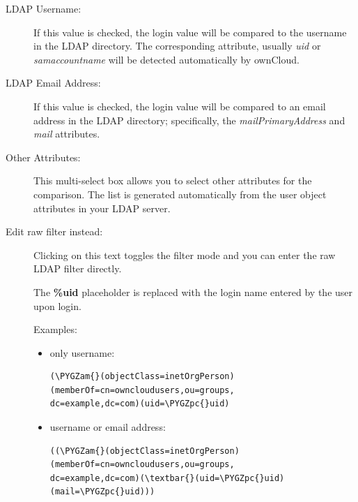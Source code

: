 \documentclass[letterpaper,10pt,english]{sphinxmanual}
\def\PYGZam{\char`\&}
\def\PYGZpc{\char`\%}
\begin{document}
\begin{description}
\item[{LDAP Username:}] \leavevmode
If this value is checked, the login value will be compared to the username in
the LDAP directory. The corresponding attribute, usually \emph{uid} or
\emph{samaccountname} will be detected automatically by ownCloud.

\item[{LDAP Email Address:}] \leavevmode
If this value is checked, the login value will be compared to an email address
in the LDAP directory; specifically, the \emph{mailPrimaryAddress} and \emph{mail}
attributes.

\item[{Other Attributes:}] \leavevmode
This multi-select box allows you to select other attributes for the
comparison. The list is generated automatically from the user object
attributes in your LDAP server.

\item[{Edit raw filter instead:}] \leavevmode
Clicking on this text toggles the filter mode and you can enter the raw LDAP
filter directly.

The \textbf{\%uid} placeholder is replaced with the login name entered by the
user upon login.

Examples:
\begin{itemize}
\item {} 
only username:

\begin{Verbatim}[commandchars=\\\{\}]
(\PYGZam{}(objectClass=inetOrgPerson)(memberOf=cn=owncloudusers,ou=groups,
dc=example,dc=com)(uid=\PYGZpc{}uid)
\end{Verbatim}

\item {} 
username or email address:

\begin{Verbatim}[commandchars=\\\{\}]
((\PYGZam{}(objectClass=inetOrgPerson)(memberOf=cn=owncloudusers,ou=groups,
dc=example,dc=com)(\textbar{}(uid=\PYGZpc{}uid)(mail=\PYGZpc{}uid)))
\end{Verbatim}

\end{itemize}

\end{description}
\end{document}
